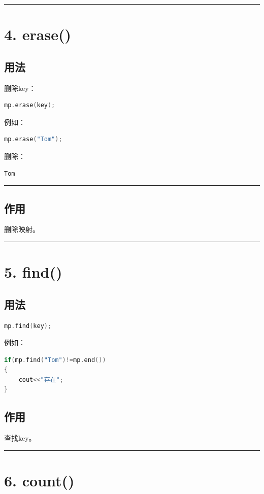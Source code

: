 \documentclass[9pt,twocolumn]{extarticle}
\begin{document}
\noindent\rule{\linewidth}{0.4pt}

\section{4. erase()}

\subsection{用法}
删除key：
\begin{lstlisting}[language=C++]
mp.erase(key);
\end{lstlisting}
例如：
\begin{lstlisting}[language=C++]
mp.erase("Tom");
\end{lstlisting}
删除：
\begin{lstlisting}
Tom
\end{lstlisting}

\noindent\rule{\linewidth}{0.4pt}

\subsection{作用}
删除映射。

\noindent\rule{\linewidth}{0.4pt}

\section{5. find()}

\subsection{用法}
\begin{lstlisting}[language=C++]
mp.find(key);
\end{lstlisting}
例如：
\begin{lstlisting}[language=C++]
if(mp.find("Tom")!=mp.end())
{
    cout<<"存在";
}
\end{lstlisting}

\subsection{作用}
查找key。

\noindent\rule{\linewidth}{0.4pt}

\section{6. count()}
\end{document}
